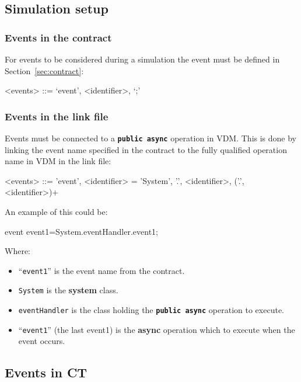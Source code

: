 \documentclass{crescendorepchap}
\newcommand{\vdmkeyw}[1]{{\bf\ttfamily #1}}
\begin{document}
\subsection{Simulation setup}

\subsubsection{Events in the contract}

For events to be considered during a simulation the event must be
defined in Section~\ref{sec:contract}:

\begin{grammar}
<events> ::= `event', <identifier>, `;'
\end{grammar}

\subsubsection{Events in the link file}

Events must be connected to a \texttt{\textbf{public async}} operation in VDM. This is
done by linking the event name specified in the contract to the fully
qualified operation name in VDM in the link file:

\begin{grammar}
<events> ::= 'event', <identifier> = 'System', '.', <identifier>, ('.', <identifier>)+
\end{grammar}

An example of this could be:

\begin{dcl}
event event1=System.eventHandler.event1;
\end{dcl}

Where:

\begin{itemize}
\item
  ``\texttt{event1}'' is the event name from the contract.
\item
  \texttt{System} is the \vdmkeyw{system} class.
\item
  \texttt{eventHandler} is the class holding the \texttt{\textbf{public async}} operation to execute.
\item
  ``\texttt{event1}'' (the last event1) is the \vdmkeyw{async} operation which to execute
  when the event occurs.
\end{itemize}

\subsection{Events in CT}
\end{document}
